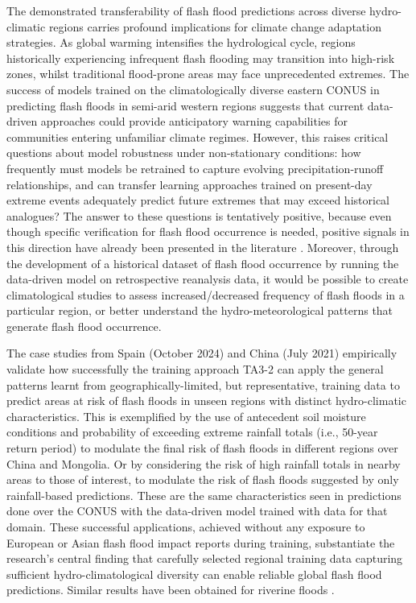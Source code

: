 The  demonstrated transferability of flash flood predictions across diverse hydro-climatic regions carries profound implications for climate change adaptation strategies. As global warming intensifies the hydrological cycle, regions historically experiencing infrequent flash flooding may transition into high-risk zones, whilst traditional flood-prone areas may face unprecedented extremes. The success of models trained on the climatologically diverse eastern CONUS in predicting flash floods in semi-arid western regions suggests that current data-driven approaches could provide anticipatory warning capabilities for communities entering unfamiliar climate regimes. However, this raises critical questions about model robustness under non-stationary conditions: how frequently must models be retrained to capture evolving precipitation-runoff relationships, and can transfer learning approaches trained on present-day extreme events adequately predict future extremes that may exceed historical analogues? The answer to these questions is tentatively positive, because even though specific verification for flash flood occurrence is needed, positive signals in this direction have already been presented in the literature \citep{Bertola_2023}. Moreover, through the development of a historical dataset of flash flood occurrence by running the data-driven model on retrospective reanalysis data, it would be possible to create climatological studies to assess increased/decreased frequency of flash floods in a particular region, or better understand the hydro-meteorological patterns that generate flash flood occurrence. 

The case studies from Spain (October 2024) and China (July 2021) empirically validate how successfully the training approach TA3-2 can apply the general patterns learnt from geographically-limited, but representative, training data to predict areas at risk of flash floods in unseen regions with distinct hydro-climatic characteristics. This is exemplified by the use of antecedent soil moisture conditions and probability of exceeding extreme rainfall totals (i.e., 50-year return period) to modulate the final risk of flash floods in different regions over China and Mongolia. Or by considering the risk of high rainfall totals in nearby areas to those of interest, to modulate the risk of flash floods suggested by only rainfall-based predictions. These are the same characteristics seen in predictions done over the CONUS with the data-driven model trained with data for that domain. These successful applications, achieved without any exposure to European or Asian flash flood impact reports during training, substantiate the research's central finding that carefully selected regional training data capturing sufficient hydro-climatological diversity can enable reliable global flash flood predictions. Similar results have been obtained for riverine floods \citep{Kratzert_2024}.


